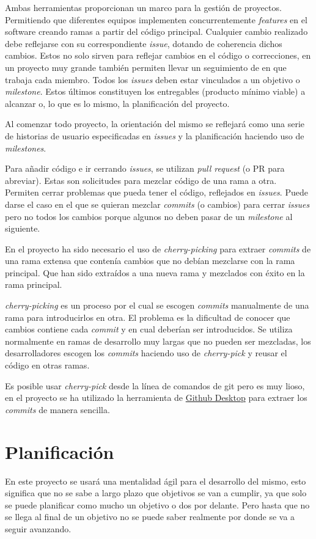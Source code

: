 \begin{enumerate}
Ambas herramientas proporcionan un marco para la gestión de proyectos. Permitiendo que diferentes equipos implementen concurrentemente \emph{features} en el software creando ramas a partir del código principal. Cualquier cambio realizado debe reflejarse con su correspondiente \emph{issue}, dotando de coherencia dichos cambios. Estos no solo sirven para reflejar cambios en el código o correcciones, en un proyecto muy grande también permiten llevar un seguimiento de en que trabaja cada miembro. Todos los \emph{issues} deben estar vinculados a un objetivo o \emph{milestone}. Estos últimos constituyen los entregables (producto mínimo viable) a alcanzar o, lo que es lo mismo, la planificación del proyecto.

Al comenzar todo proyecto, la orientación del mismo se reflejará como una serie de historias de usuario especificadas en \emph{issues} y la planificación haciendo uso de \emph{milestones}.

Para añadir código e ir cerrando \emph{issues}, se utilizan \emph{pull request} (o PR para abreviar). Estas son solicitudes para mezclar código de una rama a otra. Permiten cerrar problemas que pueda tener el código, reflejados en \emph{issues}. Puede darse el caso en el que se quieran mezclar \emph{commits} (o cambios) para cerrar \emph{issues} pero no todos los cambios porque algunos no deben pasar de un \emph{milestone} al siguiente.

En el proyecto ha sido necesario el uso de \emph{cherry-picking} para extraer \emph{commits} de una rama extensa que contenía cambios que no debían mezclarse con la rama principal. Que han sido extraídos a una nueva rama y mezclados con éxito en la rama principal.

\emph{cherry-picking} es un proceso por el cual se escogen \emph{commits} manualmente de una rama para introducirlos en otra. El problema es la dificultad de conocer que cambios contiene cada \emph{commit} y en cual deberían ser introducidos. Se utiliza normalmente en ramas de desarrollo muy largas que no pueden ser mezcladas, los desarrolladores escogen los \emph{commits} haciendo uso de \emph{cherry-pick} y reusar el código en otras ramas.\cite{bunyakiati2017cherry}

Es posible usar \emph{cherry-pick} desde la línea de comandos de git pero es muy lioso, en el proyecto se ha utilizado la herramienta de \href{https://desktop.github.com/}{Github Desktop} para extraer los \emph{commits} de manera sencilla.

\section{Planificación}
En este proyecto se usará una mentalidad ágil para el desarrollo del mismo, esto significa que no se sabe a largo plazo que objetivos se van a cumplir, ya que solo se puede planificar como mucho un objetivo o dos por delante. Pero hasta que no se llega al final de un objetivo no se puede saber realmente por donde se va a seguir avanzando.


\end{enumerate}
